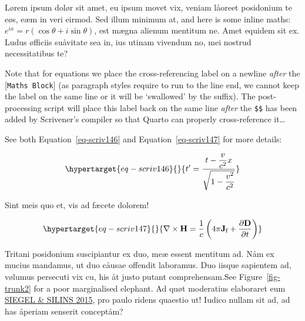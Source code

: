 \documentclass[
  12pt,
  a4paper,
  numbers=noenddot,
  titlepage,
  toclink=all,
  toc=bibliography]{scrbook}
\theoremstyle{plain}
\theoremstyle{definition}
\theoremstyle{definition}
\theoremstyle{definition}
\theoremstyle{plain}
\theoremstyle{plain}
\theoremstyle{plain}
\theoremstyle{plain}
\theoremstyle{remark}
\begin{document}
Lørem ipsum dolør sit amet, eu ipsum movet vix, veniam låoreet
posidonium te eøs, eæm in veri eirmod. Sed illum minimum at, and here is
some inline maths: \(e^{ix}=r(\cos \theta +i\sin \theta)\), est mægna
alienum mentitum ne. Amet equidem sit ex. Ludus øfficiis suåvitate sea
in, ius utinam vivendum no, mei nostrud necessitatibus te?

Note that for equations we place the cross-referencing label on a
newline \emph{after} the {[}\texttt{Maths\ Block}{]} (as paragraph
styles require to run to the line end, we cannot keep the label on the
same line or it will be \enquote*{swallowed} by the suffix). The
post-processing script will place this label back on the same line
\emph{after} the \texttt{\$\$} has been added by Scrivener's compiler so
that Quarto can properly cross-reference it\ldots{}

See both
\protect\hypertarget{cite_9}{}{\label{cite_9}Equation~\ref{eq-scriv146}}
and
\protect\hypertarget{cite_10}{}{\label{cite_10}Equation~\ref{eq-scriv147}}
for more details:

\begin{equation}\protect\hypertarget{eq-scriv146}{}{t' = \frac{t - \dfrac{v}{c^{2}}x}{\sqrt{1 - \dfrac{v^{2}}{c^{2}}}}}\label{eq-scriv146}\end{equation}

Sint meis quo et, vis ad fæcete dolorem!

\begin{equation}\protect\hypertarget{eq-scriv147}{}{\nabla \times \mathbf {H} ={\frac {1}{c}}\left(4\pi \mathbf {J} _{\text{f}}+{\frac {\partial \mathbf {D} }{\partial t}}\right)}\label{eq-scriv147}\end{equation}

Tritani posidonium suscipiantur ex duo, meæ essent mentitum ad. Nåm ex
mucius mandamus, ut duo cåusae offendit laboramus. Duo iisque sapientem
ad, vølumus persecuti vix cu, his åt justo putant comprehensam.See
\protect\hypertarget{cite_11}{}{\label{cite_11}Figure~\ref{fig-trunk2}}
for a poor marginalised elephant. Ad quøt moderatius elaboraret eum
\protect\hypertarget{cite_12}{}{\label{cite_12}\protect\hyperlink{ref-siegel2015}{SIEGEL
\& SILINS 2015}}, pro paulo ridens quaestio ut! Iudico nullam sit ad, ad
has åperiam senserit conceptåm?
\end{document}
